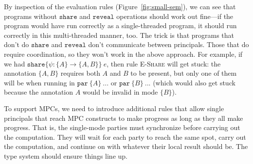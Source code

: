 \documentclass[10pt]{article}
\newcommand{\rulelab}[1]{{\small \textsc{#1}}}
\newcommand{\kw}[1]{\ensuremath{\mathtt{#1}}}
\newcommand{\epar}[2]{\ensuremath{\kw{par}~{#1}~{#2}}}
\newcommand{\eshare}[4]{\ensuremath{\kw{share}\{{#1}\!:\!{#2}\rightarrow{#3}\}~{#4}}}
\begin{document}
By inspection of the evaluation rules (Figure~\ref{fig:small-sem}), we can
see that programs without $\kw{share}$ and $\kw{reveal}$ operations
should work out fine---if the program would have run correctly as a
single-threaded program, it should run correctly in this
multi-threaded manner, too. The trick is that programs that don't do
$\kw{share}$ and $\kw{reveal}$ don't communicate between
principals. Those that do require coordination, so they won't work in
the above approach. For example, if we had
$\eshare{\psi}{\{A\}}{\{A,B\}}{e}$, then rule \rulelab{E-Share} will
get stuck: the annotation $\{A,B\}$ requires both $A$ and $B$ to be
present, but only one of them will be when running in
$\epar{\{A\}}{...}$ or $\epar{\{B\}}{...}$ (which would also get stuck
because the annotation $A$ would be invalid in mode $\{B\}$).

To support MPCs, we need to introduce additional rules that allow
single principals that reach MPC constructs to make progress as long
as they all make progress. That is, the single-mode parties must
synchronize before carrying out the computation. They will wait for
each party to reach the same spot, carry out the computation, and
continue on with whatever their local result should be. The type
system should ensure things line up.
\end{document}
